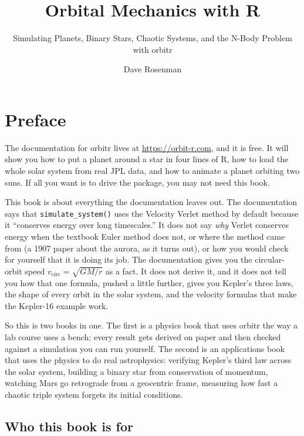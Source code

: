 \documentclass[
  10.5pt,
  letterpaper,
]{scrbook}
\title{Orbital Mechanics with R}
\subtitle{Simulating Planets, Binary Stars, Chaotic Systems, and the
N-Body Problem with orbitr}
\author{Dave Rosenman}
\date{}
\renewcommand*\contentsname{Table of contents}
\newcommand\contentsname{Table of contents}
\theoremstyle{definition}
\theoremstyle{plain}
\theoremstyle{remark}
\begin{document}
\frontmatter
\maketitle

\renewcommand*\contentsname{Table of contents}
{
\setcounter{tocdepth}{1}
\tableofcontents
}

\mainmatter
{}

\chapter*{Preface}\label{preface}


The documentation for orbitr lives at \url{https://orbit-r.com}, and it
is free. It will show you how to put a planet around a star in four
lines of R, how to load the whole solar system from real JPL data, and
how to animate a planet orbiting two suns. If all you want is to drive
the package, you may not need this book.

This book is about everything the documentation leaves out. The
documentation says that \texttt{simulate\_system()} uses the Velocity
Verlet method by default because it ``conserves energy over long
timescales.'' It does not say \emph{why} Verlet conserves energy when
the textbook Euler method does not, or where the method came from (a
1907 paper about the aurora, as it turns out), or how you would check
for yourself that it is doing its job. The documentation gives you the
circular-orbit speed \(v_{\mathrm{circ}} = \sqrt{GM/r}\) as a fact. It
does not derive it, and it does not tell you how that one formula,
pushed a little further, gives you Kepler's three laws, the shape of
every orbit in the solar system, and the velocity formulas that make the
Kepler-16 example work.

So this is two books in one. The first is a physics book that uses
orbitr the way a lab course uses a bench: every result gets derived on
paper and then checked against a simulation you can run yourself. The
second is an applications book that uses the physics to do real
astrophysics: verifying Kepler's third law across the solar system,
building a binary star from conservation of momentum, watching Mars go
retrograde from a geocentric frame, measuring how fast a chaotic triple
system forgets its initial conditions.

\section*{Who this book is for}\label{who-this-book-is-for}
\end{document}
